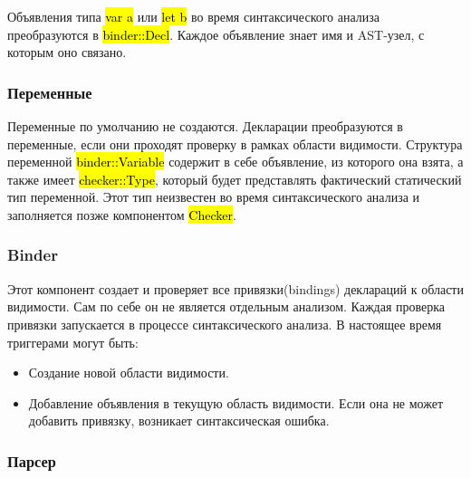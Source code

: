 Объявления типа \hl{var a} или \hl{let b} во время синтаксического анализа преобразуются в \hl{binder::Decl}.
Каждое объявление знает имя и AST-узел, с которым оно связано.

\subsubsection{Переменные}

Переменные по умолчанию не создаются.
Декларации преобразуются в переменные, если они проходят проверку в рамках области видимости.
Структура переменной \hl{binder::Variable} содержит в себе объявление, из которого она взята, а также имеет
\hl{checker::Type}, который будет представлять фактический статический тип переменной.
Этот тип неизвестен во время синтаксического анализа и заполняется позже компонентом \hl{Checker}.

\subsubsection{Binder}

Этот компонент создает и проверяет все привязки(bindings) деклараций к области видимости.
Сам по себе он не является отдельным анализом.
Каждая проверка привязки запускается в процессе синтаксического анализа.
В настоящее время триггерами могут быть:

\begin{itemize}[left=2em]
    \item Создание новой области видимости.
    \item Добавление объявления в текущую область видимости.
    Если она не может добавить привязку, возникает синтаксическая ошибка.
\end{itemize}

\subsubsection{Парсер}

